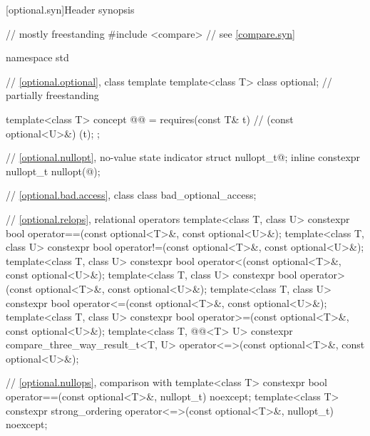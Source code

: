 [optional.syn]{Header  synopsis}

%
\begin{codeblock}
// mostly freestanding
#include <compare>              // see \ref{compare.syn}

namespace std {
  // \ref{optional.optional}, class template 
  template<class T>
    class optional;                                                     // partially freestanding

  template<class T>
    concept @@ = requires(const T& t) {       // (const optional<U>&){ }(t);
    };

  // \ref{optional.nullopt}, no-value state indicator
  struct nullopt_t{@\seebelow@};
  inline constexpr nullopt_t nullopt(@\unspec@);

  // \ref{optional.bad.access}, class 
  class bad_optional_access;

  // \ref{optional.relops}, relational operators
  template<class T, class U>
    constexpr bool operator==(const optional<T>&, const optional<U>&);
  template<class T, class U>
    constexpr bool operator!=(const optional<T>&, const optional<U>&);
  template<class T, class U>
    constexpr bool operator<(const optional<T>&, const optional<U>&);
  template<class T, class U>
    constexpr bool operator>(const optional<T>&, const optional<U>&);
  template<class T, class U>
    constexpr bool operator<=(const optional<T>&, const optional<U>&);
  template<class T, class U>
    constexpr bool operator>=(const optional<T>&, const optional<U>&);
  template<class T, @@<T> U>
    constexpr compare_three_way_result_t<T, U>
      operator<=>(const optional<T>&, const optional<U>&);

  // \ref{optional.nullops}, comparison with 
  template<class T> constexpr bool operator==(const optional<T>&, nullopt_t) noexcept;
  template<class T>
    constexpr strong_ordering operator<=>(const optional<T>&, nullopt_t) noexcept;

}
\end{codeblock}
